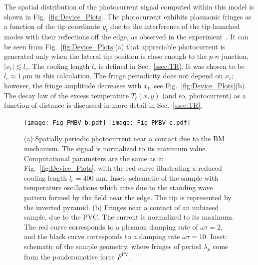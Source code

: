 \documentclass[aps, prb, reprint, superscriptaddress]{revtex4-2}
\begin{document}
The spatial distribution of the photocurrent signal computed within this model is shown in Fig.~\ref{fig:Device_Plots}.
The photocurrent exhibits plasmonic fringes as a function of the tip coordinate $y_{t}$ due to the interference of the tip-launched modes with their reflections off the edge,
as observed in the experiment~\cite{AlonsoGonzalez2016, Menabde2021}.
It can be seen from Fig.~\ref{fig:Device_Plots}(a) that appreciable photocurrent is generated only when the
lateral tip position is close enough to the $p$-$n$ junction, $|x_{t} | \lesssim l_c$.
The cooling length $l_c$ is defined in Sec.~\ref{ssec:TR}. It was chosen to be $l_c \approx 1\,\mu\mathrm{m}$ in this calculation. 
The fringe periodicity does not depend on $x_t$; however, the fringe amplitude decreases with $x_t$,
see Fig.~\ref{fig:Device_Plots}(b).
The decay law of the excess temperature  $T_t(x, y)$ (and so, photocurrent) as a function of distance is discussed in more detail in Sec.~\ref{ssec:TR}. 

\begin{figure}[th]
\texttt{[image: Fig\_PMBV\_b.pdf]}
\texttt{[image: Fig\_PMBV\_c.pdf]}
\caption{
	(a) Spatially periodic photocurrent near a contact due to the BM mechanism. The signal is normalized to its maximum value. 
	Computational parameters are the same as in Fig.~\ref{fig:Device_Plots}, with the red curve illustrating a reduced cooling length $l_c = 400$ nm. 
	Inset: schematic of the sample with temperature oscillations which arise due to the standing wave pattern formed by the field near the edge. The tip is represented by the inverted pyramid. 
	(b) Fringes near a contact of an unbiased sample, due to the PVC. The current is normalized to its maximum.
	The red curve corresponds to a plasmon damping rate of $\omega \tau = 2$, and the black curve corresponds to a damping rate $\omega \tau = 10$. 
	Inset: schematic of the sample geometry, where fringes of period $\lambda_p$ come from the ponderomotive force $F^{\mathrm{PV}}$. }
\label{fig:BMPV_plot}
\end{figure}
\end{document}

